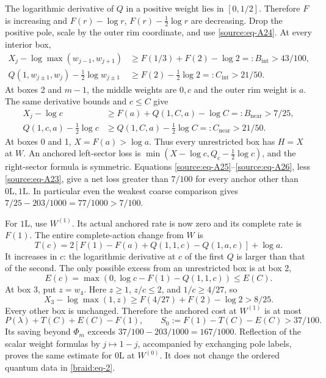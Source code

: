 \documentclass[11pt]{article}
\numberwithin{equation}{section}
\begin{document}
The logarithmic derivative of \(Q\) in a positive weight lies in
\([0,1/2]\). Therefore \(F\) is increasing and \(F(r)-\log r\),
\(F(r)-\tfrac12\log r\) are decreasing. Drop the positive pole, scale by
the outer rim coordinate, and use \eqref{source:eq-A24}. At every interior box, \begin{equation}\label{source:eq-A25}
\begin{split}
 X_j-\log\max(w_{j-1},w_{j+1})
 &\ge F(1/3)+F(2)-\log2=:B_{\mathrm{int}}>43/100,\\
 Q(1,w_{j\pm1},w_j)-\tfrac12\log w_{j\pm1}
 &\ge F(2)-\tfrac12\log2=:C_{\mathrm{int}}>21/50.
\end{split}
\end{equation} At boxes 2 and \(m-1\), the middle weights are \(0,c\) and the outer
rim weight is \(a\). The same derivative bounds and \(c\le C\) give \begin{equation}\label{source:eq-A26}
\begin{split}
 X_j-\log c&\ge F(a)+Q(1,C,a)-\log C=:B_{\mathrm{near}}>7/25,\\
 Q(1,c,a)-\tfrac12\log c
       &\ge Q(1,C,a)-\tfrac12\log C=:C_{\mathrm{near}}>21/50.
\end{split}
\end{equation} At boxes 0 and 1, \(X=F(a)>\log a\). Thus every unrestricted box has \(H=X\)
at \(W\). An anchored left-sector loss is
\(\min(X-\log c,Q_c-\tfrac12\log c)\), and the right-sector formula is
symmetric. Equations \eqref{source:eq-A25}--\eqref{source:eq-A26}, less \eqref{source:eq-A23}, give a net loss greater
than \(7/100\) for every anchor other than \(0\mathrm L,1\mathrm L\). In
particular even the weakest coarse comparison gives
\(7/25-203/1000=77/1000>7/100\).

For \(1\mathrm L\), use \(W^{(1)}\). Its actual anchored rate is now
zero and its complete rate is \(F(1)\). The entire complete-action
change from \(W\) is \begin{equation}\label{source:eq-A27}
T(c)=2[F(1)-F(a)+Q(1,1,c)-Q(1,a,c)]+\log a.
\end{equation} It increases in \(c\): the logarithmic derivative at \(c\) of the
first \(Q\) is larger than that of the second. The only possible
excess from an unrestricted box is at box 2, \begin{equation}\label{source:eq-A28}
E(c)=\max(0,\log c-F(1)-Q(1,1,c))\le E(C).
\end{equation} At box 3, put \(z=w_4\). Here \(z\ge1\), \(z/c\le2\), and
\(1/c\ge4/27\), so \begin{equation}\label{source:eq-A29}
X_3-\log\max(1,z)
 \ge F(4/27)+F(2)-\log2>8/25.
\end{equation} Every other box is unchanged. Therefore the anchored cost at
\(W^{(1)}\) is at most \begin{equation}\label{source:eq-A30}
P(\lambda)+T(C)+E(C)-F(1),
 \qquad S_0:=F(1)-T(C)-E(C)>37/100.
\end{equation} Its saving beyond \(\Phi_m\) exceeds \(37/100-203/1000=167/1000\).
Reflection of the scalar weight formulas by \(j\mapsto1-j\), accompanied
by exchanging pole labels, proves the same estimate for \(0\mathrm L\)
at \(W^{(0)}\). It does not change the ordered quantum data in \eqref{braid:eq-2}.
\end{document}
